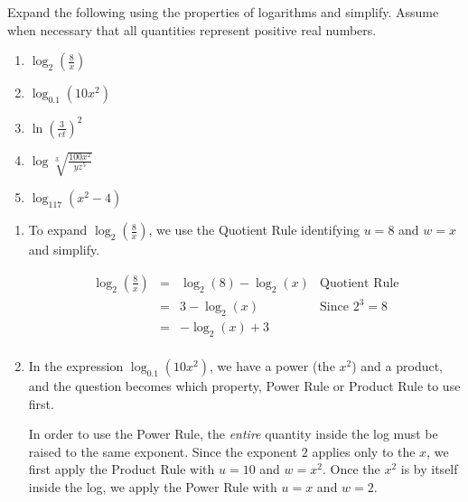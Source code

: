 \documentclass{ximera}
\begin{document}
\begin{example}  \label{expandlogex} Expand the following using the properties of logarithms and simplify.  Assume when necessary that all quantities represent positive real numbers.

\begin{enumerate}

\item $\log_{2}\left(\frac{8}{x}\right)$ 

\item $\log_{0.1} \left(10 x^2 \right)$ 

\item  $\ln \left(\frac{3}{et}\right)^2$

\item  $\log \sqrt[3]{\frac{100 x^2}{yz^5}}$

\item \label{factorlogpropex} $\log_{117}\left(x^2 - 4\right)$

\setcounter{HW}{\value{enumi}}
\end{enumerate}

\begin{explanation}

\begin{enumerate}

\item  To expand $\log_{2}\left(\frac{8}{x}\right)$, we use the Quotient Rule identifying $u = 8$ and $w=x$ and simplify.


\[ \begin{array}{rclr}

\log_{2}\left(\frac{8}{x}\right) & = &  \log_{2}(8) - \log_{2}(x) & \text{Quotient Rule} \\

& = &  3 - \log_{2}(x) & \text{Since $2^{3} = 8$} \\

& = & - \log_{2}(x) + 3 & \\

\end{array}\]



\item   In the expression $\log_{0.1} \left(10 x^2 \right)$, we have a power (the $x^2$) and a product, and the question becomes which property, Power Rule or Product Rule to use first.

In order to use the Power Rule, the \textit{entire} quantity inside the log must be raised to the same exponent.  Since the exponent $2$ applies only to the $x$, we first apply the Product Rule with $u=10$ and $w=x^2$.  Once  the $x^2$ is by itself inside the log, we apply the Power Rule with $u=x$ and $w=2$.



\end{enumerate}
\end{explanation}
\end{example}
\end{document}
